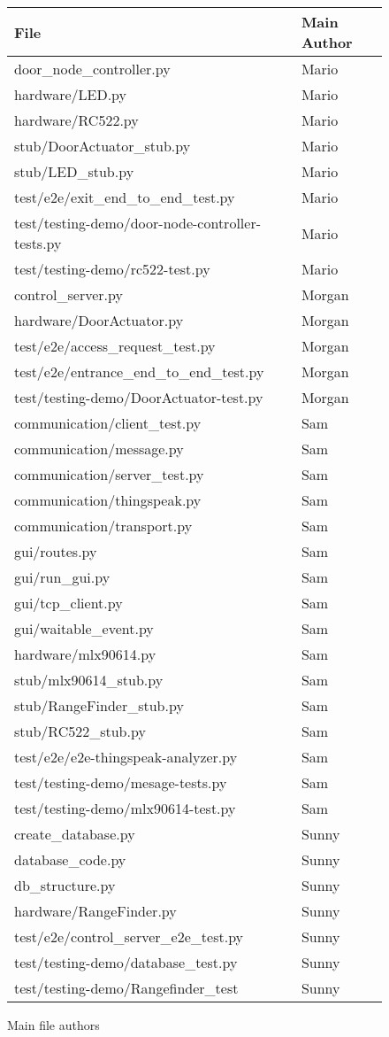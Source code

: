 \begin{figure}[ht]
\centering
\begin{tabular}{ll}
File & Main Author\\
\hline
door\_node\_controller.py & Mario\\
hardware/LED.py & Mario\\
hardware/RC522.py & Mario\\
stub/DoorActuator\_stub.py & Mario\\
stub/LED\_stub.py & Mario\\
test/e2e/exit\_end\_to\_end\_test.py & Mario\\
test/testing-demo/door-node-controller-tests.py & Mario\\
test/testing-demo/rc522-test.py & Mario\\
control\_server.py & Morgan\\
hardware/DoorActuator.py & Morgan\\
test/e2e/access\_request\_test.py & Morgan\\
test/e2e/entrance\_end\_to\_end\_test.py & Morgan\\
test/testing-demo/DoorActuator-test.py & Morgan\\
communication/client\_test.py & Sam\\
communication/message.py & Sam\\
communication/server\_test.py & Sam\\
communication/thingspeak.py & Sam\\
communication/transport.py & Sam\\
gui/routes.py & Sam\\
gui/run\_gui.py & Sam\\
gui/tcp\_client.py & Sam\\
gui/waitable\_event.py & Sam\\
hardware/mlx90614.py & Sam\\
stub/mlx90614\_stub.py & Sam\\
stub/RangeFinder\_stub.py & Sam\\
stub/RC522\_stub.py & Sam\\
test/e2e/e2e-thingspeak-analyzer.py & Sam\\
test/testing-demo/mesage-tests.py & Sam\\
test/testing-demo/mlx90614-test.py & Sam\\
create\_database.py & Sunny\\
database\_code.py & Sunny\\
db\_structure.py & Sunny\\
hardware/RangeFinder.py & Sunny\\
test/e2e/control\_server\_e2e\_test.py & Sunny\\
test/testing-demo/database\_test.py & Sunny\\
test/testing-demo/Rangefinder\_test & Sunny\\
\end{tabular}
\caption{Main file authors}
\label{fig:file-authors}
\end{figure}

